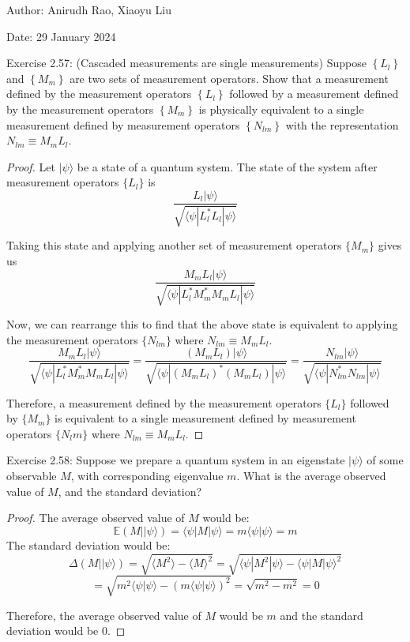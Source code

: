 
Author: Anirudh Rao, Xiaoyu Liu

Date: 29 January 2024
\begin{problem}
	Exercise 2.57: (Cascaded measurements are single measurements) Suppose $\left\{L_l\right\}$ and $\left\{M_m\right\}$ are two sets of measurement operators. Show that a measurement defined by the measurement operators $\left\{L_l\right\}$ followed by a measurement defined by the measurement operators $\left\{M_m\right\}$ is physically equivalent to a single measurement defined by measurement operators $\left\{N_{l m}\right\}$ with the representation $N_{l m} \equiv M_m L_l$.
\end{problem}
\begin{proof}
	
Let \(|\psi\rangle\) be a state of a quantum system. The state of the system after measurement operators \(\{L_l\}\) is
\[ \frac{L_l |\psi\rangle}{\sqrt{\langle \psi|L_l^* L_l|\psi\rangle}} \]

Taking this state and applying another set of measurement operators \(\{M_m\}\) gives us
\[ \frac{M_m L_l |\psi\rangle}{\sqrt{\langle \psi|L_l^* M_m^* M_m L_l|\psi\rangle}} \]

Now, we can rearrange this to find that the above state is equivalent to applying the measurement operators \(\{N_{lm}\}\) where \(N_{lm} \equiv M_m L_l\).
\[ \frac{M_m L_l |\psi\rangle}{\sqrt{\langle \psi|L_l^* M_m^* M_m L_l|\psi\rangle}} = \frac{(M_m L_l) |\psi\rangle}{\sqrt{\langle \psi|(M_m L_l)^* (M_m L_l)|\psi\rangle}} = \frac{N_{lm} |\psi\rangle}{\sqrt{\langle \psi|N_{lm}^* N_{lm}|\psi\rangle}} \]

Therefore, a measurement defined by the measurement operators \(\{L_l\}\) followed by \(\{M_m\}\) is equivalent to a single measurement defined by measurement operators \(\{N_lm\}\) where \(N_{lm} \equiv M_m L_l\).
\end{proof}

\begin{problem}
	Exercise 2.58: Suppose we prepare a quantum system in an eigenstate $|\psi\rangle$ of some observable $M$, with corresponding eigenvalue $m$. What is the average observed value of $M$, and the standard deviation?
\end{problem}
\begin{proof}

The average observed value of \(M\) would be:
\[ \mathbb{E}\left(M | |\psi\rangle\right) = \langle\psi|M|\psi\rangle = m \langle\psi|\psi\rangle = m \]
The standard deviation would be:
\[ \Delta\left(M | |\psi\rangle\right) = \sqrt{\langle M^2 \rangle - \langle M \rangle^2} = \sqrt{\langle \psi | M^2 | \psi \rangle - \langle \psi | M | \psi \rangle^2} \]
\[ = \sqrt{m^2\langle\psi|\psi\rangle - \left(m\langle\psi|\psi\rangle\right)^2} = \sqrt{m^2 - m^2} = 0 \]

Therefore, the average observed value of \(M\) would be \(m\) and the standard deviation would be \(0\).
	
\end{proof}

